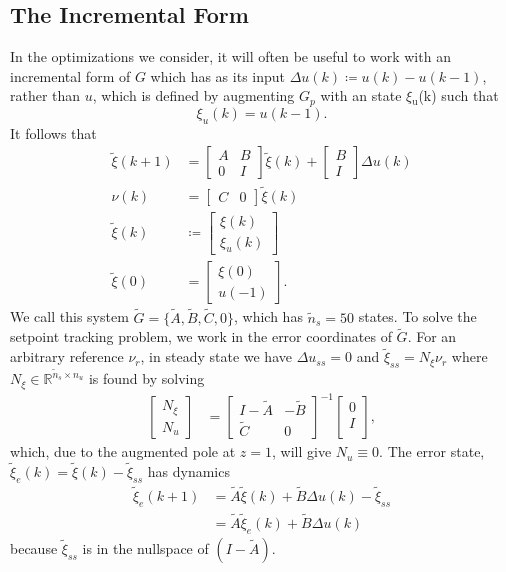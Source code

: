 \documentclass[journal,12pt,twocolumn,twoside]{IEEEtran/IEEEtran}
\newcommand{\du}{\ensuremath{\Delta u }\xspace}
\newcommand{\Gd}{\ensuremath{\tilde G }\xspace}
\newcommand{\Ad}{\ensuremath{\tilde A }\xspace}
\newcommand{\Bd}{\ensuremath{\tilde B }\xspace}
\newcommand{\Cd}{\ensuremath{\tilde C }\xspace}
\newcommand{\xd}{\ensuremath{\tilde \xi }\xspace}
\newcommand{\x}{\ensuremath{\xi }\xspace}
\newcommand{\xdss}{\ensuremath{\tilde \xi_{ss} }\xspace}
\newcommand{\xde}{\ensuremath{\tilde \xi_{e} }\xspace}
\newcommand{\y}{\ensuremath{\nu} \xspace}
\newcommand{\dd}{\ensuremath{\Delta }\xspace}
\begin{document}
\subsection{The Incremental Form}
In the optimizations we consider, it will often be useful to work with an incremental form of \(G\) which has as its input \({\Delta u(k)\coloneqq u(k)-u(k-1)}\), rather than \(u\), which is defined by augmenting \(G_p\) with an state \x\(_{\text{u}}\)(k) such that
\begin{equation*}
  \x_u(k) = u(k-1).
\end{equation*}
It follows that
\begin{subequations}
\begin{align}
  \xd(k+1)
  &=
    \begin{bmatrix}
      A & B\\ 0 & I
    \end{bmatrix}
    \xd(k)
    +
    \begin{bmatrix}
      B\\I
    \end{bmatrix}
  \Delta u(k) \\
  \y(k) & = \begin{bmatrix}C & 0\end{bmatrix}\xd(k)\\
  \xd(k)& \coloneqq \begin{bmatrix}\x(k)\\\x_u(k) \end{bmatrix}\\
  \xd(0) & = \begin{bmatrix}\x(0)\\u(-1)\end{bmatrix}. \label{eqn:x0_aug}
\end{align}\label{eqn:ssdelta}%
\end{subequations}
We call this system \(\Gd = \{\Ad, \Bd, \Cd, 0\}\), which has \({\tilde{n}_s=50}\) states.
To solve the setpoint tracking problem, we work in the error
coordinates of \(\Gd\).
For an arbitrary reference \(\y_r\), in steady state we have \({\du_{ss}=0}\) and \(\xdss =N_{\xi}\y_r\) where \({N_{\xi}\in\mathds{R}^{\tilde{n}_s\times n_u} }\) is found by solving
\begin{align}
  \begin{bmatrix}N_{\xi} \\ N_u\end{bmatrix} &=
\begin{bmatrix}I-\Ad & -\Bd\\\Cd & 0\end{bmatrix}^{-1}\begin{bmatrix}0\\ I\\\end{bmatrix}\label{eqn:nxnu},
\end{align}
which, due to the augmented pole at $z=1$, will give \(N_u\equiv 0\). 
The error state, \({\xde(k)=\xd(k) - \xdss}\) has dynamics
\begin{align}
  \xde(k+1) & = \Ad\xd(k) + \Bd\dd u(k) - \xdss \nonumber\\
            & = \Ad \xde(k)   + \Bd \dd u(k)\nonumber
\end{align}
because $\xdss$ is in the nullspace of $(I - \Ad)$.
\end{document}
